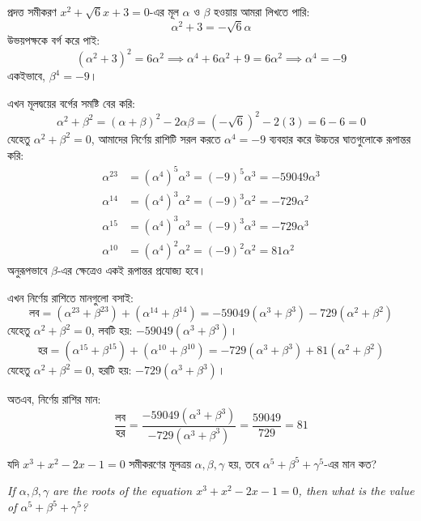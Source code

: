 \documentclass[12pt, a4paper]{article}
\begin{document}
\begin{tcolorbox}[solutionbox={সমাধান (Solution)}]
    \noindent
    প্রদত্ত সমীকরণ $x^2 + \sqrt{6}x + 3 = 0$-এর মূল $\alpha$ ও $\beta$ হওয়ায় আমরা লিখতে পারি:
    \[ \alpha^2 + 3 = -\sqrt{6}\alpha \]
    উভয়পক্ষকে বর্গ করে পাই:
    \[ (\alpha^2 + 3)^2 = 6\alpha^2 \implies \alpha^4 + 6\alpha^2 + 9 = 6\alpha^2 \implies \alpha^4 = -9 \]
    একইভাবে, $\beta^4 = -9$।
    
    \vspace{0.5em}
    এখন মূলদ্বয়ের বর্গের সমষ্টি বের করি:
    \[ \alpha^2 + \beta^2 = (\alpha+\beta)^2 - 2\alpha\beta = (-\sqrt{6})^2 - 2(3) = 6 - 6 = 0 \]
    যেহেতু $\alpha^2 + \beta^2 = 0$, আমাদের নির্ণেয় রাশিটি সরল করতে $\alpha^4 = -9$ ব্যবহার করে উচ্চতর ঘাতগুলোকে রূপান্তর করি:
    \begin{align*}
        \alpha^{23} &= (\alpha^4)^5 \alpha^3 = (-9)^5 \alpha^3 = -59049\alpha^3 \\
        \alpha^{14} &= (\alpha^4)^3 \alpha^2 = (-9)^3 \alpha^2 = -729\alpha^2 \\
        \alpha^{15} &= (\alpha^4)^3 \alpha^3 = (-9)^3 \alpha^3 = -729\alpha^3 \\
        \alpha^{10} &= (\alpha^4)^2 \alpha^2 = (-9)^2 \alpha^2 = 81\alpha^2
    \end{align*}
    অনুরূপভাবে $\beta$-এর ক্ষেত্রেও একই রূপান্তর প্রযোজ্য হবে। 
    
    \vspace{0.5em}
    এখন নির্ণেয় রাশিতে মানগুলো বসাই:
    \[ \text{লব} = (\alpha^{23} + \beta^{23}) + (\alpha^{14} + \beta^{14}) = -59049(\alpha^3 + \beta^3) - 729(\alpha^2 + \beta^2) \]
    যেহেতু $\alpha^2 + \beta^2 = 0$, লবটি হয়: $-59049(\alpha^3 + \beta^3)$।
    \[ \text{হর} = (\alpha^{15} + \beta^{15}) + (\alpha^{10} + \beta^{10}) = -729(\alpha^3 + \beta^3) + 81(\alpha^2 + \beta^2) \]
    যেহেতু $\alpha^2 + \beta^2 = 0$, হরটি হয়: $-729(\alpha^3 + \beta^3)$।
    
    \vspace{0.5em}
    অতএব, নির্ণেয় রাশির মান:
    \[ \frac{\text{লব}}{\text{হর}} = \frac{-59049(\alpha^3 + \beta^3)}{-729(\alpha^3 + \beta^3)} = \frac{59049}{729} = 81 \]
\end{tcolorbox}

\begin{tcolorbox}[questionbox={প্রশ্ন (Question) 29}]
    \noindent
    যদি $x^3 + x^2 - 2x - 1 = 0$ সমীকরণের মূলত্রয় $\alpha, \beta, \gamma$ হয়, তবে $\alpha^5 + \beta^5 + \gamma^5$-এর মান কত?
    
    \vspace{0.8em}
    \begin{english}
    \noindent\textit{\color{darkgray}
    If $\alpha, \beta, \gamma$ are the roots of the equation $x^3 + x^2 - 2x - 1 = 0$, then what is the value of $\alpha^5 + \beta^5 + \gamma^5$?
    }
    \end{english}
\end{tcolorbox}
\end{document}
